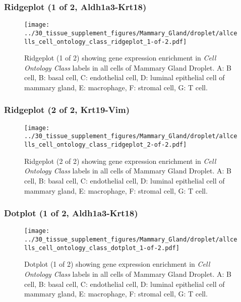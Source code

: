 \clearpage

\subsubsection{Ridgeplot (1 of 2, Aldh1a3-Krt18)}
\begin{figure}[h]
\centering
\texttt{[image: ../30\_tissue\_supplement\_figures/Mammary\_Gland/droplet/allcells\_cell\_ontology\_class\_ridgeplot\_1-of-2.pdf]}

\caption{ Ridgeplot (1 of 2)  showing gene expression enrichment in \emph{Cell Ontology Class} labels in all cells of Mammary Gland Droplet. A: B cell, B: basal cell, C: endothelial cell, D: luminal epithelial cell of mammary gland, E: macrophage, F: stromal cell, G: T cell.}
\end{figure}


\clearpage

\subsubsection{Ridgeplot (2 of 2, Krt19-Vim)}
\begin{figure}[h]
\centering
\texttt{[image: ../30\_tissue\_supplement\_figures/Mammary\_Gland/droplet/allcells\_cell\_ontology\_class\_ridgeplot\_2-of-2.pdf]}

\caption{ Ridgeplot (2 of 2)  showing gene expression enrichment in \emph{Cell Ontology Class} labels in all cells of Mammary Gland Droplet. A: B cell, B: basal cell, C: endothelial cell, D: luminal epithelial cell of mammary gland, E: macrophage, F: stromal cell, G: T cell.}
\end{figure}


\clearpage

\subsubsection{Dotplot (1 of 2, Aldh1a3-Krt18)}
\begin{figure}[h]
\centering
\texttt{[image: ../30\_tissue\_supplement\_figures/Mammary\_Gland/droplet/allcells\_cell\_ontology\_class\_dotplot\_1-of-2.pdf]}

\caption{ Dotplot (1 of 2)  showing gene expression enrichment in \emph{Cell Ontology Class} labels in all cells of Mammary Gland Droplet. A: B cell, B: basal cell, C: endothelial cell, D: luminal epithelial cell of mammary gland, E: macrophage, F: stromal cell, G: T cell.}
\end{figure}


